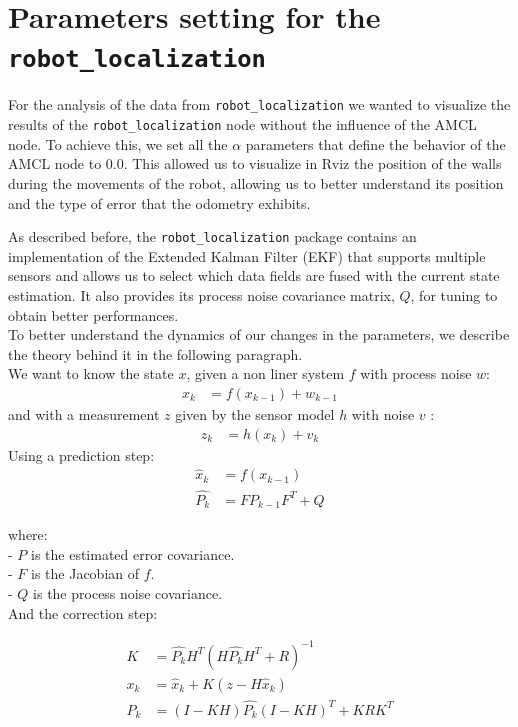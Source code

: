 \newpage
\section{Parameters setting for the \texttt{robot\_localization}\label{test_and_evaluation}}

For the analysis of the data from \texttt{robot\_localization} we wanted to visualize the results of the \texttt{robot\_localization} node without the influence of the AMCL node. To achieve this, we set all the $\alpha$ parameters that define the behavior of the AMCL node to 0.0. This allowed us to visualize in Rviz the position of the walls during the movements of the robot, allowing us to better understand its position and the type of error that the odometry exhibits.

As described before, the \texttt{robot\_localization} package contains an implementation of the Extended Kalman Filter (EKF) that supports multiple sensors and allows us to select which data fields are fused with the current state estimation. It also provides its process noise covariance matrix, $Q$, for tuning to obtain better performances.\\
To better understand the dynamics of our changes in the parameters, we describe the theory behind it in the following paragraph.\\
We want to know the state $x$, given a non liner system $f$ with process noise $w$:
\begin{align}
	x_k &= f(x_{k-1})+w_{k-1}
\end{align}
and with a measurement $z$ given by the sensor model $h$ with noise $v$ :
\begin{align}
	z_k &= h(x_k)+v_k
\end{align}
Using a prediction step:
\begin{align}
	\hat{x}_{k} &= f({x}_{k-1}) \\
	\hat{P_{k}} &= F P_{k-1} F^T + Q
\end{align}

where:\\
- $P$ is the estimated error covariance.\\
- $F$ is the Jacobian of $f$.\\
- $Q$ is the process noise covariance.\\

And the correction step:

\begin{align}
	K &= \hat{P_{k}} H^T (H\hat{P_{k}}H^T+R)^{-1} \\
	x_k &= \hat{x}_k + K(z-H\hat{x}_k)\\
	P_k &= (I-KH)\hat{P_{k}}(I-KH)^T+KRK^T
\end{align}

